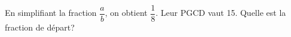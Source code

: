 %
%
En simplifiant la fraction $\dfrac{a}{b}$, on obtient $\dfrac{1}{8}$. Leur PGCD vaut 15. Quelle est la fraction de départ?
